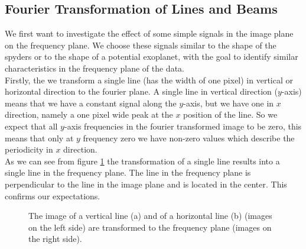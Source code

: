 \subsection{Fourier Transformation of Lines and Beams}
We first want to investigate the effect of some simple signals in the image plane on the frequency plane. We choose these signals similar to the shape of the spyders or to the shape of a potential exoplanet, with the goal to identify similar characteristics in the frequency plane of the data.\\
Firstly, the we transform a single line (has the width of one pixel) in vertical or horizontal direction to the fourier plane. A single line in vertical direction ($y$-axis) means that we have a constant signal along the $y$-axis, but we have one in $x$ direction, namely a one pixel wide peak at the $x$ position of the line. So we expect that all $y$-axis frequencies in the fourier transformed image to be zero, this means that only at $y$ frequency zero we have non-zero values which describe the periodicity in $x$ direction.\\
As we can see from figure \ref{fig:fft_line} the transformation of a single line results into a single line in the frequency plane. The line in the frequency plane is perpendicular to the line in the image plane and is located in the center. This confirms our expectations. 
\begin{figure}[H]
	\centering
\caption{The image of a vertical line (a) and of a horizontal line (b) (images on the left side) are transformed to the frequency plane (images on the right side).}
\label{fig:fft_line}
\end{figure}
